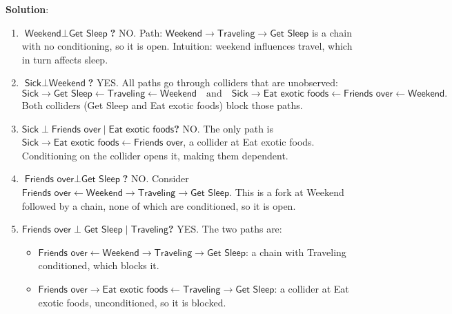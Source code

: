 \documentclass[submit]{../harvardml}
\newcommand{\attr}[1]{\textsf{#1}}
\newenvironment{solution}{
    \vspace{2mm}
    \color{blue}\noindent\textbf{Solution}:
}{}
\begin{document}
\begin{solution}
\begin{enumerate}
\item \textbf{$\attr{Weekend}\perp\attr{Get Sleep}$?}  
  NO.  Path: 
  \(\attr{Weekend}\to\attr{Traveling}\to\attr{Get Sleep}\) is a chain with no conditioning, so it is open.  Intuition: weekend influences travel, which in turn affects sleep.

\item \textbf{$\attr{Sick}\perp\attr{Weekend}$?}  
  YES.  All paths go through colliders that are unobserved:
  \[
    \attr{Sick}\to\attr{Get Sleep}\leftarrow\attr{Traveling}\leftarrow\attr{Weekend}
    \quad\text{and}\quad
    \attr{Sick}\to\attr{Eat exotic foods}\leftarrow\attr{Friends over}\leftarrow\attr{Weekend}.
  \]
  Both colliders (\attr{Get Sleep} and \attr{Eat exotic foods}) block those paths.

\item \textbf{$\attr{Sick}\perp\attr{Friends over}\mid\attr{Eat exotic foods}$?}  
  NO.  The only path is
  \(\attr{Sick}\to\attr{Eat exotic foods}\leftarrow\attr{Friends over}\),
  a collider at \attr{Eat exotic foods}.  Conditioning on the collider opens it, making them dependent.

\item \textbf{$\attr{Friends over}\perp\attr{Get Sleep}$?}  
  NO.  Consider
  \(\attr{Friends over}\leftarrow\attr{Weekend}\to\attr{Traveling}\to\attr{Get Sleep}\).
  This is a fork at \attr{Weekend} followed by a chain, none of which are conditioned, so it is open.

\item \textbf{$\attr{Friends over}\perp\attr{Get Sleep}\mid\attr{Traveling}$?}  
  YES.  The two paths are:
  \begin{itemize}
    \item \(\attr{Friends over}\leftarrow\attr{Weekend}\to\attr{Traveling}\to\attr{Get Sleep}\): a chain with \attr{Traveling} conditioned, which blocks it.
    \item \(\attr{Friends over}\to\attr{Eat exotic foods}\leftarrow\attr{Traveling}\to\attr{Get Sleep}\): a collider at \attr{Eat exotic foods}, unconditioned, so it is blocked.
  \end{itemize}


\end{enumerate}
\end{solution}
\end{document}
